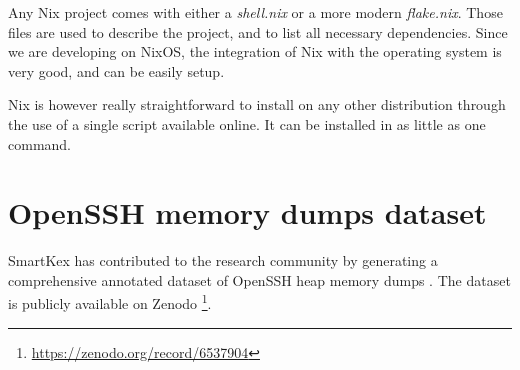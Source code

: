     Any Nix project comes with either a \textit{shell.nix} or a more modern \textit{flake.nix}. Those files are used to describe the project, and to list all necessary dependencies. Since we are developing on NixOS, the integration of Nix with the operating system is very good, and can be easily setup.
    
    Nix is however really straightforward to install on any other distribution through the use of a single script available online. It can be installed in as little as one command.






\section{OpenSSH memory dumps dataset}\label{sec:background:kex:dataset}

    SmartKex has contributed to the research community by generating a comprehensive annotated dataset of OpenSSH heap memory dumps \cite{SmartKex22}. The dataset is publicly available on Zenodo \footnote{\url{https://zenodo.org/record/6537904}}. 

